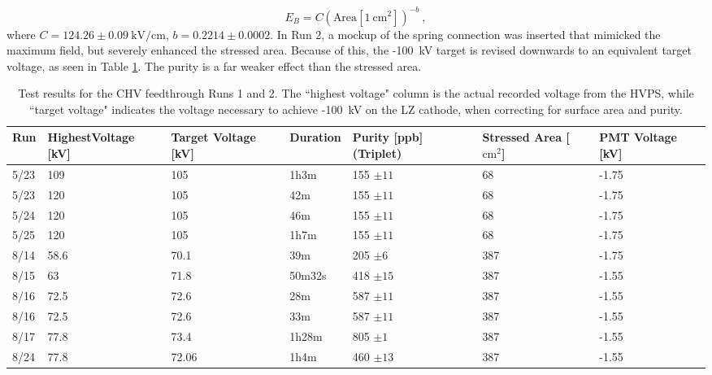 \begin{equation}
E_B = C(\text{Area} [ 1\mathrm{~cm}^2])^{-b}~,
\end{equation}
\noindent
where $C=124.26 \pm 0.09 \mathrm{~kV}/\mathrm{cm}$, $b = 0.2214 \pm 0.0002$.
In Run 2, a mockup of the spring connection was inserted that mimicked the maximum field, but severely enhanced the stressed area. 
Because of this, the -100~kV target is revised downwards to an equivalent target voltage, as seen in Table \ref{table:chv_results}. 
The purity is a far weaker effect than the stressed area.

\begin{table}
\centering
\begin{tabular}{|l|p{1.75cm}|p{1.75cm}|p{1.75cm}|p{1.75cm}|p{1.75cm}|p{1.75cm}|}
\hline
 Run & Highest\newline Voltage  [kV]& Target \newline Voltage  [kV] & Duration  & Purity [ppb] (Triplet)  & Stressed Area [$\mathrm{cm}^2$] & PMT Voltage [kV] \\ \hline
 5/23   &  109  &  105  & 1h3m  & 155 $\pm 11 $  & 68  &-1.75  \\
  5/23  &  120 &  105   & 42m     & 155 $\pm 11 $  &  68 &-1.75\\
  5/24  &  120  &  105  & 46m     & 155 $\pm 11 $  & 68  &-1.75  \\
  5/25  &  120  &  105  & 1h7m & 155 $\pm 11 $  & 68  &-1.75   \\
  8/14  &  58.6  &  70.1 & 39m     & 205 $\pm 6 $   & 387 &-1.75 \\
 8/15  &  63   &  71.8  & 50m32s &  418 $\pm 15$  & 387 &-1.55  \\
  8/16 &  72.5 &  72.6  & 28m     &   587 $\pm 11$ & 387 &-1.55  \\
  8/16 &  72.5  &  72.6 & 33m     &  587 $\pm 11$  & 387 &-1.55  \\
   8/17 &  77.8 &  73.4  & 1h28m & 805 $\pm 1 $   & 387 &-1.55  \\
   8/24 &  77.8 &  72.06  & 1h4m & 460 $\pm 13$   & 387 &-1.55 \\
 \hline
\end{tabular}
\caption{Test results for the CHV feedthrough Runs 1 and 2. 
The ``highest voltage" column is the actual recorded voltage from the HVPS, while ``target voltage" indicates the voltage necessary to achieve -100~kV on the LZ cathode, when correcting for surface area and purity.}
\label{table:chv_results}
\end{table}




